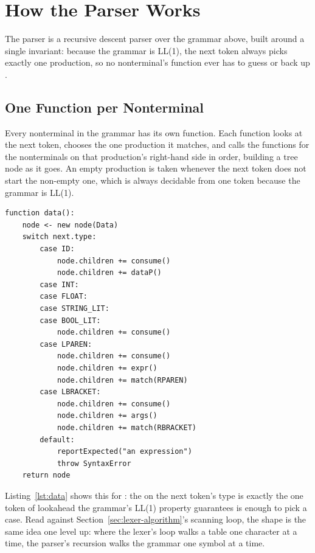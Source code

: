 \section{How the Parser Works}

The parser is a recursive descent parser over the grammar above, built
around a single invariant: because the grammar is LL(1), the next token
always picks exactly one production, so no nonterminal's function ever has
to guess or back up \cite{aho2006compilers}.

\subsection{One Function per Nonterminal}

Every nonterminal in the grammar has its own function. Each function looks
at the next token, chooses the one production it matches, and calls the
functions for the nonterminals on that production's right-hand side in
order, building a tree node as it goes. An empty production is taken
whenever the next token does not start the non-empty one, which is always
decidable from one token because the grammar is LL(1).

\begin{lstlisting}[style=pseudocode,
    caption={The function behind \nt{Data}.}, label=lst:data]
function data():
    node <- new node(Data)
    switch next.type:
        case ID:
            node.children += consume()
            node.children += dataP()
        case INT:
        case FLOAT:
        case STRING_LIT:
        case BOOL_LIT:
            node.children += consume()
        case LPAREN:
            node.children += consume()
            node.children += expr()
            node.children += match(RPAREN)
        case LBRACKET:
            node.children += consume()
            node.children += args()
            node.children += match(RBRACKET)
        default:
            reportExpected("an expression")
            throw SyntaxError
    return node
\end{lstlisting}

Listing~\ref{lst:data} shows this for : the  on the
next token's type is exactly the one token of lookahead the grammar's
LL(1) property guarantees is enough to pick a case. Read against
Section~\ref{sec:lexer-algorithm}'s scanning loop, the shape is the same
idea one level up: where the lexer's loop walks a table one character at a
time, the parser's recursion walks the grammar one symbol at a time.

